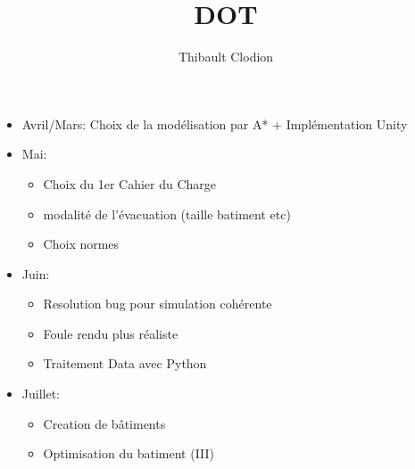 \documentclass[12pt]{article}
\title{DOT}
\author{Thibault Clodion}
\begin{document}
\maketitle %


\begin{itemize}
    \item Avril/Mars: Choix de la modélisation par A* + Implémentation Unity
    \item Mai: 
    \begin{itemize}
        \item Choix du 1er Cahier du Charge
        \item modalité de l’évacuation (taille batiment etc)
        \item Choix normes
    \end{itemize}
    \item Juin: 
    \begin{itemize}
        \item Resolution bug pour simulation cohérente
        \item Foule rendu plus réaliste
        \item Traitement Data avec Python
    \end{itemize}
    \item Juillet: 
    \begin{itemize}
        \item Creation de bâtiments
        \item Optimisation du batiment (III)
    \end{itemize}
\end{itemize}
\end{document}
